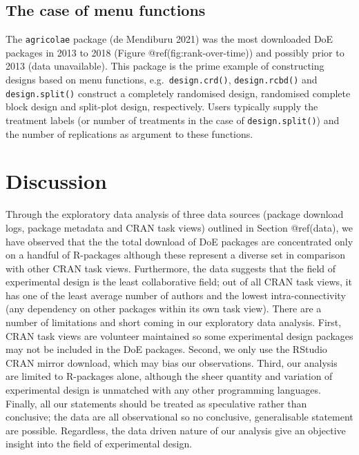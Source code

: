 \documentclass{article}
\begin{document}
\hypertarget{the-case-of-menu-functions}{%
\subsection{The case of menu
functions}\label{the-case-of-menu-functions}}

The \texttt{agricolae} package (de Mendiburu 2021) was the most
downloaded DoE packages in 2013 to 2018 (Figure
@ref(fig:rank-over-time)) and possibly prior to 2013 (data unavailable).
This package is the prime example of constructing designs based on menu
functions, e.g.~\texttt{design.crd()}, \texttt{design.rcbd()} and
\texttt{design.split()} construct a completely randomised design,
randomised complete block design and split-plot design, respectively.
Users typically supply the treatment labels (or number of treatments in
the case of \texttt{design.split()}) and the number of replications as
argument to these functions.

\hypertarget{discussion}{%
\section{Discussion}\label{discussion}}

Through the exploratory data analysis of three data sources (package
download logs, package metadata and CRAN task views) outlined in Section
@ref(data), we have observed that the the total download of DoE packages
are concentrated only on a handful of R-packages although these
represent a diverse set in comparison with other CRAN task views.
Furthermore, the data suggests that the field of experimental design is
the least collaborative field; out of all CRAN task views, it has one of
the least average number of authors and the lowest intra-connectivity
(any dependency on other packages within its own task view). There are a
number of limitations and short coming in our exploratory data analysis.
First, CRAN task views are volunteer maintained so some experimental
design packages may not be included in the DoE packages. Second, we only
use the RStudio CRAN mirror download, which may bias our observations.
Third, our analysis are limited to R-packages alone, although the sheer
quantity and variation of experimental design is unmatched with any
other programming languages. Finally, all our statements should be
treated as speculative rather than conclusive; the data are all
observational so no conclusive, generalisable statement are possible.
Regardless, the data driven nature of our analysis give an objective
insight into the field of experimental design.
\end{document}
